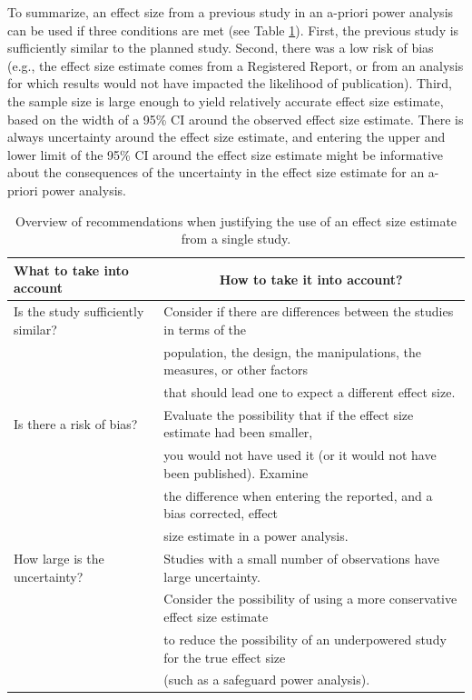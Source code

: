 \documentclass[
  english,
  ,jou, a4paper,floatsintext]{apa6}
\begin{document}
To summarize, an effect size from a previous study in an a-priori power analysis can be used if three conditions are met (see Table \ref{tab:table-es-just}). First, the previous study is sufficiently similar to the planned study. Second, there was a low risk of bias (e.g., the effect size estimate comes from a Registered Report, or from an analysis for which results would not have impacted the likelihood of publication). Third, the sample size is large enough to yield relatively accurate effect size estimate, based on the width of a 95\% CI around the observed effect size estimate. There is always uncertainty around the effect size estimate, and entering the upper and lower limit of the 95\% CI around the effect size estimate might be informative about the consequences of the uncertainty in the effect size estimate for an a-priori power analysis.

\begin{table}[tbp]

\begin{center}
\begin{threeparttable}

\caption{\label{tab:table-es-just}Overview of recommendations when justifying the use of an effect size estimate from a single study.}

\begin{tabular}{ll}
\toprule
What to take into account & \multicolumn{1}{c}{How to take it into account?}\\
\midrule
Is the study sufficiently similar? & Consider if there are differences between the studies in terms of the\\
 & population, the design, the manipulations, the measures, or other factors\\
 & that should lead one to expect a different effect size.\\ \midrule
Is there a risk of bias? & Evaluate the possibility that if the effect size estimate had been smaller,\\
 & you would not have used it (or it would not have been published). Examine\\
 & the difference when entering the reported, and a bias corrected, effect\\
 & size estimate in a power analysis.\\ \midrule
How large is the uncertainty? & Studies with a small number of observations have large uncertainty.\\
 & Consider the possibility of using a more conservative effect size estimate\\
 & to reduce the possibility of an underpowered study for the true effect size\\
 & (such as a safeguard power analysis).\\
\bottomrule
\end{tabular}

\end{threeparttable}
\end{center}

\end{table}
\end{document}
